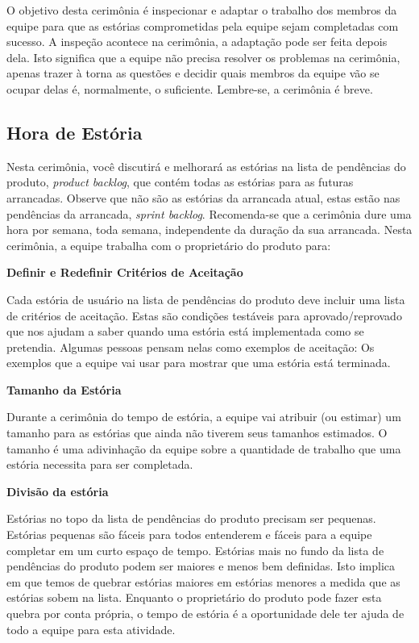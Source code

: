O objetivo desta cerimônia é inspecionar e adaptar o trabalho dos membros da equipe para que as estórias comprometidas pela equipe sejam completadas com sucesso. A inspeção acontece na cerimônia, a adaptação pode ser feita depois dela. Isto significa que a equipe não precisa resolver os problemas na cerimônia, apenas trazer à torna as questões e decidir quais membros da equipe vão se ocupar delas é, normalmente, o suficiente. Lembre-se, a cerimônia é breve.

\subsection{Hora de Estória}

Nesta cerimônia, você discutirá e melhorará as estórias na lista de pendências do produto, \emph{product backlog}, que contém todas as estórias para as futuras arrancadas. Observe que não são as estórias da arrancada atual, estas estão nas pendências da arrancada, \emph{sprint backlog}. Recomenda-se que a cerimônia dure uma hora por semana, toda semana, independente da duração da sua arrancada. Nesta cerimônia, a equipe trabalha com o proprietário do produto para:

\noindent \textbf{\small Definir e Redefinir Critérios de Aceitação}

Cada estória de usuário na lista de pendências do produto deve incluir uma lista de critérios de aceitação. Estas são condições testáveis para aprovado/reprovado que nos ajudam a saber quando uma estória está implementada como se pretendia. Algumas pessoas pensam nelas como exemplos de aceitação: Os exemplos que a equipe vai usar para mostrar que uma estória está terminada.

\noindent \textbf{\small Tamanho da Estória}

Durante a cerimônia do tempo de estória, a equipe vai atribuir (ou estimar) um tamanho para as estórias que ainda não tiverem seus tamanhos estimados. O tamanho é uma adivinhação da equipe sobre a quantidade de trabalho que uma estória necessita para ser completada.

\noindent \textbf{\small Divisão da estória}

Estórias no topo da lista de pendências do produto precisam ser pequenas. Estórias pequenas são fáceis para todos entenderem e fáceis para a equipe completar em um curto espaço de tempo. Estórias mais no fundo da lista de pendências do produto podem ser maiores e menos bem definidas. Isto implica em que temos de quebrar estórias maiores em estórias menores a medida que as estórias sobem na lista. Enquanto o proprietário do produto pode fazer esta quebra por conta própria, o tempo de estória é a oportunidade dele ter ajuda de todo a equipe para esta atividade.

